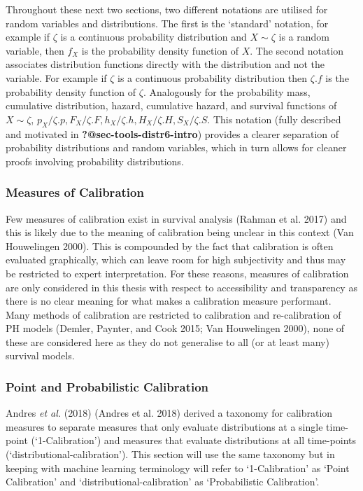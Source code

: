 \documentclass[
  letterpaper,
]{scrbook}
\theoremstyle{plain}
\theoremstyle{definition}
\theoremstyle{remark}
\begin{document}
Throughout these next two sections, two different notations are utilised
for random variables and distributions. The first is the `standard'
notation, for example if \(\zeta\) is a continuous probability
distribution and \(X \sim \zeta\) is a random variable, then \(f_X\) is
the probability density function of \(X\). The second notation
associates distribution functions directly with the distribution and not
the variable. For example if \(\zeta\) is a continuous probability
distribution then \(\zeta.f\) is the probability density function of
\(\zeta\). Analogously for the probability mass, cumulative
distribution, hazard, cumulative hazard, and survival functions of
\(X \sim \zeta\),
\(p_X/\zeta.p, F_X/\zeta.F, h_X/\zeta.h, H_X/\zeta.H, S_X/\zeta.S\).
This notation (fully described and motivated in
\textbf{?@sec-tools-distr6-intro}) provides a clearer separation of
probability distributions and random variables, which in turn allows for
cleaner proofs involving probability distributions.

\hypertarget{measures-of-calibration}{%
\subsubsection*{Measures of Calibration}\label{measures-of-calibration}}

Few measures of calibration exist in survival analysis (Rahman et al.
2017) and this is likely due to the meaning of calibration being unclear
in this context (Van Houwelingen 2000). This is compounded by the fact
that calibration is often evaluated graphically, which can leave room
for high subjectivity and thus may be restricted to expert
interpretation. For these reasons, measures of calibration are only
considered in this thesis with respect to accessibility and transparency
as there is no clear meaning for what makes a calibration measure
performant. Many methods of calibration are restricted to calibration
and re-calibration of PH models (Demler, Paynter, and Cook 2015; Van
Houwelingen 2000), none of these are considered here as they do not
generalise to all (or at least many) survival models.

\hypertarget{point-and-probabilistic-calibration}{%
\subsubsection*{Point and Probabilistic
Calibration}\label{point-and-probabilistic-calibration}}

Andres \textit{et al.} (2018) (Andres et al. 2018) derived a taxonomy
for calibration measures to separate measures that only evaluate
distributions at a single time-point (`1-Calibration') and measures that
evaluate distributions at all time-points
(`distributional-calibration'). This section will use the same taxonomy
but in keeping with machine learning terminology will refer to
`1-Calibration' as `Point Calibration' and `distributional-calibration'
as `Probabilistic Calibration'.
\end{document}
